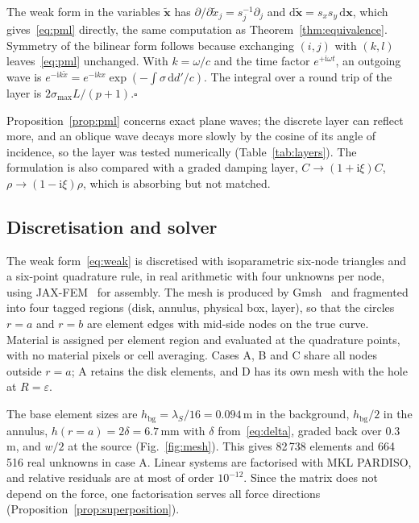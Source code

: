 \documentclass[preprint,12pt]{elsarticle}
\newcommand{\mbf}[1]{\mathbf{#1}}
\newcommand{\qedbox}{\hfill$\square$}
\begin{document}
\begin{pf}
The weak form in the variables $\tilde{\mbf{x}}$ has $\partial/\partial\tilde{x}_j=s_j^{-1}\partial_j$ and
$\mathrm{d}\tilde{\mbf{x}}=s_xs_y\,\mathrm{d}\mbf{x}$, which gives~\eqref{eq:pml} directly, the same computation as
Theorem~\ref{thm:equivalence}. Symmetry of the bilinear form follows because exchanging $(i,j)$ with $(k,l)$ leaves~\eqref{eq:pml}
unchanged. With $k=\omega/c$ and the time factor $e^{+\mathrm{i}\omega t}$, an outgoing wave is $e^{-\mathrm{i}k\tilde{x}}=e^{-\mathrm{i}kx}\exp(-\int\sigma\,\mathrm{d}d'/c)$.
The integral over a round trip of the layer is $2\sigma_{\max}L/(p+1)$.\qedbox
\end{pf}

Proposition~\ref{prop:pml} concerns exact plane waves; the discrete layer can reflect more, and an oblique wave decays more slowly by the
cosine of its angle of incidence, so the layer was tested numerically (Table~\ref{tab:layers}). The formulation is also
compared with a graded damping layer, $C\to(1+\mathrm{i}\xi)C$, $\rho\to(1-\mathrm{i}\xi)\rho$, which is absorbing but not matched.

\subsection{Discretisation and solver}\label{sec:discretisation}

The weak form~\eqref{eq:weak} is discretised with isoparametric six-node triangles and a six-point quadrature rule, in real arithmetic with
four unknowns per node, using JAX-FEM~\citep{xu2020jaxfem} for assembly. The mesh is produced by Gmsh~\citep{geuzaine2009} and fragmented
into four tagged regions (disk, annulus, physical box, layer), so that the circles $r=a$ and $r=b$ are element edges with mid-side nodes on the true curve. Material is assigned
per element region and evaluated at the quadrature points, with no material pixels or cell averaging. Cases A, B and C share all nodes outside $r=a$; A retains the disk elements, and D has its own mesh with the hole at $R=\varepsilon$.

The base element sizes are $h_{\mathrm{bg}}=\lambda_S/16=0.094$\,m in the background, $h_{\mathrm{bg}}/2$ in the annulus,
$h(r{=}a)=2\delta=6.7$\,mm with $\delta$ from~\eqref{eq:delta}, graded back over $0.3$\,m, and $w/2$ at the source
(Fig.~\ref{fig:mesh}). This gives 82\,738 elements and 664\,516 real unknowns in case A. Linear systems are
factorised with MKL PARDISO, and relative residuals are at most of order $10^{-12}$. Since the matrix does not depend on the force,
one factorisation serves all force directions (Proposition~\ref{prop:superposition}).
\end{document}
